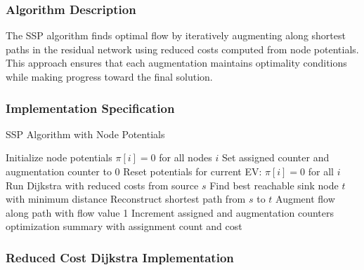 \documentclass[12pt,a4paper]{article}
\begin{document}
\subsubsection{Algorithm Description}

The SSP algorithm finds optimal flow by iteratively augmenting along shortest paths in the residual network using reduced costs computed from node potentials. This approach ensures that each augmentation maintains optimality conditions while making progress toward the final solution.

\subsubsection{Implementation Specification}

\begin{algorithm}[H]
\caption{SSP Algorithm with Node Potentials}
\begin{algorithmic}[1]
\STATE Initialize node potentials $\pi[i] = 0$ for all nodes $i$
\STATE Set assigned counter and augmentation counter to 0
    \STATE Reset potentials for current EV: $\pi[i] = 0$ for all $i$
    \STATE Run Dijkstra with reduced costs from source $s$
    \STATE Find best reachable sink node $t$ with minimum distance
        \STATE Reconstruct shortest path from $s$ to $t$
        \STATE Augment flow along path with flow value 1
        \STATE Increment assigned and augmentation counters
    \ENDIF
\ENDFOR
\RETURN optimization summary with assignment count and cost
\end{algorithmic}
\end{algorithm}

\subsubsection{Reduced Cost Dijkstra Implementation}
\end{document}
